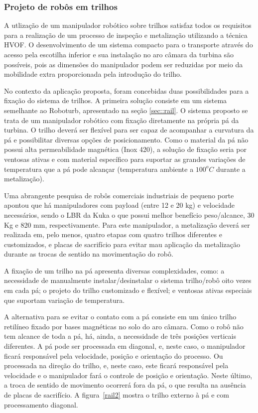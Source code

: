 \subsubsection{Projeto de robôs em trilhos}\label{proj_rail}
 
A utlização de um manipulador robótico sobre trilhos satisfaz todos os
requisitos para a realização de um processo de inspeção e metalização utilizando a técnica HVOF. O desenvolvimento
de um sistema compacto para o transporte através do acesso pela escotilha
inferior e sua instalação no aro câmara da turbina são possíveis, pois as
dimensões do manipulador podem ser reduzidas por meio da
mobilidade extra proporcionada pela introdução do trilho.

No contexto da aplicação proposta, foram concebidas duas possibilidades para a
fixação do sistema de trilhos. A primeira solução consiste em um sistema
semelhante ao Roboturb, apresentado na seção \ref{sec::rail}. O sistema proposto
se trata de um manipulador robótico com fixação diretamente na própria pá da
turbina. O trilho deverá ser flexível para ser capaz de acompanhar a curvatura
da pá e possibilitar diversas opções de posicionamento. Como o material da pá
não possui alta permeabilidade magnética (Inox 420), a solução de fixação seria
por ventosas ativas e com material específico para suportar as grandes
variações de temperatura que a pá pode alcançar (temperatura ambiente a
$100^oC$ durante a metalização).

Uma abrangente pesquisa de robôs comerciais industriais de pequeno porte apontou
que há manipuladores com payload (entre 12 e 20 kg) e velocidade necessários,
sendo o LBR da Kuka o que possui melhor benefício peso/alcance, 30 Kg e 820 mm,
respectivamente. Para este manipulador, a metalização deverá ser
realizada em, pelo menos, quatro etapas com quatro trilhos diferentes e
customizados, e placas de sacrifício para evitar mau aplicação da metalização
durante as trocas de sentido na movimentação do robô.

A fixação de um trilho na pá apresenta diversas complexidades, como: a
necessidade de manualmente instalar/desinstalar o sistema trilho/robô oito vezes
em cada pá; o projeto do trilho customizado e flexível; e ventosas ativas
especiais que suportam variação de temperatura.

A alternativa para se evitar o contato com a pá consiste em um único trilho
retilíneo fixado por bases magnéticas no solo do aro câmara. Como o robô não
tem alcance de toda a pá, há, ainda, a necessidade de três posições verticais
diferentes. A pá pode ser processada em diagonal, e, neste caso, o manipulador
ficará responsável pela velocidade, posição e orientação do processo. Ou processada na
direção do trilho, e, neste caso, este ficará responsável pela velocidade e o
manipulador fará o controle de posição e orientação. Neste último, a troca de
sentido de movimento ocorrerá fora da pá, o que resulta na ausência de placas de
sacrifício. A figura~\ref{rail2} mostra o trilho externo à pá e com
processamento diagonal.

